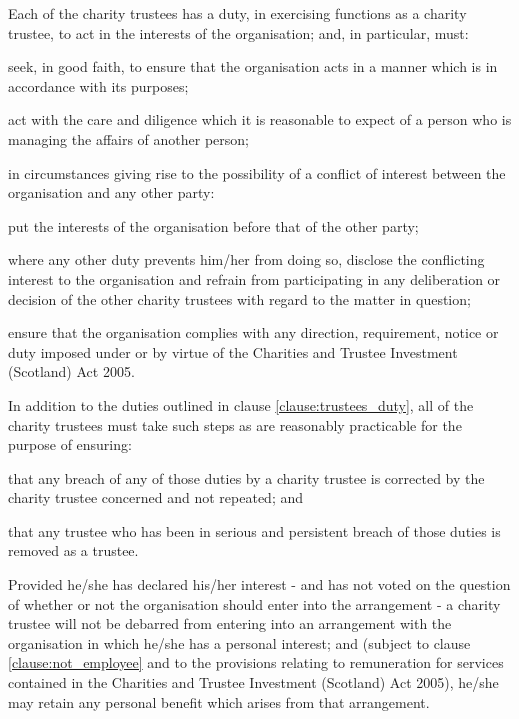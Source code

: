 ﻿\documentclass[a4paper,11pt,onecolumn ]{article}
\begin{document}
\begin{legal}
\item \label{clause:trustees_duty} Each of the charity trustees has a duty, in exercising functions as a charity trustee, to act in the interests of the organisation; and, in particular, must:
    \begin{legal}
        \item seek, in good faith, to ensure that the organisation acts in a manner which is in accordance with its purposes;
        \item act with the care and diligence which it is reasonable to expect of a person who is managing the affairs of another person;
        \item in circumstances giving rise to the possibility of a conflict of interest between the organisation and any other party:
        \begin{legal}
            \item put the interests of the organisation before that of the other party;
            \item where any other duty prevents him/her from doing so, disclose the conflicting interest to the organisation and refrain from participating in any deliberation or decision of the other charity trustees with regard to the matter in question;
        \end{legal}
        \item ensure that the organisation complies with any direction, requirement, notice or duty imposed  under or by virtue of the Charities and Trustee Investment (Scotland) Act 2005.
    \end{legal}

\item In addition to the duties outlined in clause \ref{clause:trustees_duty}, all of the charity trustees must take such steps as are reasonably practicable for the purpose of ensuring:
    \begin{legal}
        \item that any breach of any of those duties by a charity trustee is corrected by the charity trustee concerned and not repeated; and
        \item that any trustee who has been in serious and persistent breach of those duties is removed as a trustee.
    \end{legal}
\item Provided he/she has declared his/her interest - and has not voted on the question of whether or not the organisation should enter into the arrangement - a charity trustee will not be debarred from entering into an arrangement with the organisation in which he/she has a personal interest; and (subject to clause \ref{clause:not_employee} and to the provisions relating to remuneration for services contained in the Charities and Trustee Investment (Scotland) Act 2005), he/she may retain any personal benefit which arises from that arrangement.


\end{legal}
\end{document}
